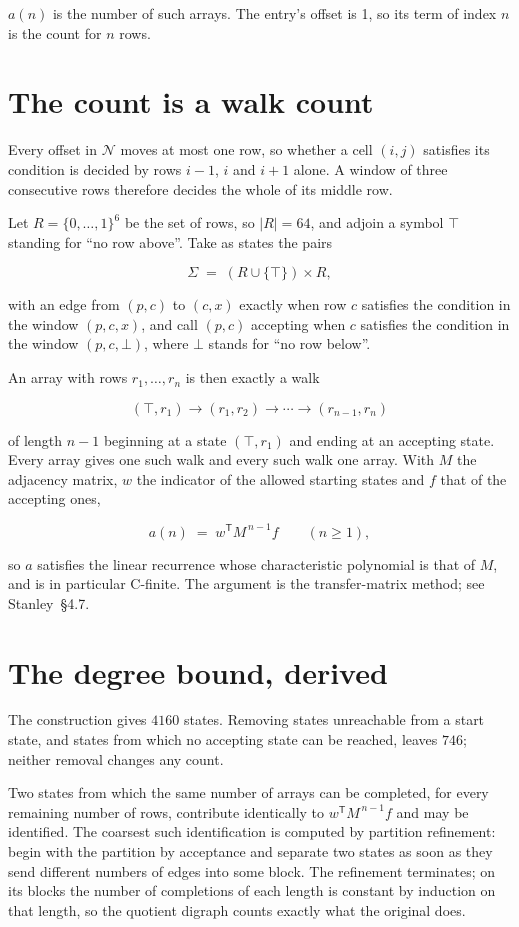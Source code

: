 \documentclass[11pt]{article}
\theoremstyle{definition}
\begin{document}
$a(n)$ is the number of such arrays. The entry's offset is 1, so its term of index $n$ is the count for $n$ rows.

\section{The count is a walk count}

Every offset in $\mathcal{N}$ moves at most one row, so whether a cell $(i,j)$ satisfies its condition is decided by rows $i-1$, $i$ and $i+1$ alone. A window of three consecutive rows therefore decides the whole of its middle row.

Let $R = \{0,\dots,1\}^{6}$ be the set of rows, so $|R| = 64$, and adjoin a symbol $\top$ standing for ``no row above''. Take as states the pairs

\[\Sigma \;=\; (R \cup \{\top\}) \times R,\]

with an edge from $(p,c)$ to $(c,x)$ exactly when row $c$ satisfies the condition in the window $(p,c,x)$, and call $(p,c)$ accepting when $c$ satisfies the condition in the window $(p,c,\bot)$, where $\bot$ stands for ``no row below''.

An array with rows $r_1,\dots,r_n$ is then exactly a walk

\[(\top,r_1) \to (r_1,r_2) \to \cdots \to (r_{n-1},r_n)\]

of length $n-1$ beginning at a state $(\top,r_1)$ and ending at an accepting state. Every array gives one such walk and every such walk one array. With $M$ the adjacency matrix, $w$ the indicator of the allowed starting states and $f$ that of the accepting ones,

\[a(n) \;=\; w^{\mathsf T} M^{\,n-1} f \qquad (n \ge 1),\]

so $a$ satisfies the linear recurrence whose characteristic polynomial is that of $M$, and is in particular C-finite. The argument is the transfer-matrix method; see Stanley~\S4.7.

\section{The degree bound, derived}

The construction gives $4160$ states. Removing states unreachable from a start state, and states from which no accepting state can be reached, leaves $746$; neither removal changes any count.

Two states from which the same number of arrays can be completed, for every remaining number of rows, contribute identically to $w^{\mathsf T}M^{\,n-1}f$ and may be identified. The coarsest such identification is computed by partition refinement: begin with the partition by acceptance and separate two states as soon as they send different numbers of edges into some block. The refinement terminates; on its blocks the number of completions of each length is constant by induction on that length, so the quotient digraph counts exactly what the original does.
\end{document}

